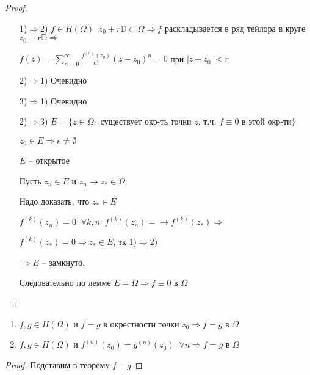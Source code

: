 \begin{proof}\thmslashn
	
	\begin{enumerate}
		\item[1)$\Rightarrow$2)] 
		$f\in H(\Omega) \;\; z_0 + r\mathbb{D} \subset \Omega \Rightarrow f$ раскладывается в ряд тейлора в круге $z_0 + r\mathbb{D} \Rightarrow$
		
		$f(z) = \sum\limits_{n= 0}^{\infty} \frac{f^{(n)}(z_0)}{n!}(z - z_0)^n = 0$ при $|z-z_0| < r$
		\item[2)$\Rightarrow$1)]
		Очевидно
		\item[3)$\Rightarrow$1)]
		Очевидно
		\item[2)$\Rightarrow$3)]
		$E = \{z \in \Omega: \text{ существует окр-ть точки }z\text{, т.ч. } f\equiv 0\text{ в этой окр-ти} \}$
		
		$z_0 \in E \Rightarrow e \not = \emptyset$
		
		$E$ -- открытое
		
		Пусть $z_n \in E$ и $z_n \to z_* \in \Omega$
		
		Надо доказать, что $z_* \in E$
		
		$f^{(k)}(z_n) = 0\;\; \forall k, n \;\; f^{(k)}(z_n) = \to f^{(k)}(z_*) \Rightarrow$
		
		$f^{(k)}(z_*) = 0 \Rightarrow z_* \in E$, тк 1)$\Rightarrow$2)
		
		$\Rightarrow E$ -- замкнуто. 
		
		Следовательно по лемме $E = \Omega \Rightarrow f\equiv 0$ в $\Omega$
		
	\end{enumerate}
		
\end{proof}

\begin{consequence}\thmslashn

	\begin{enumerate}
		\item 
		$f, g \in H(\Omega)$ и $f = g$ в окрестности точки $z_0 \Rightarrow f= g$ в $\Omega$
		\item
		$f, g \in H(\Omega)$ и $f^{(n)}(z_0) = g^{(n)}(z_0)\;\; \forall n \Rightarrow f = g$ в $\Omega$ 
	\end{enumerate}
	
\end{consequence}

\begin{proof}
	Подставим в теорему $f - g$
\end{proof}